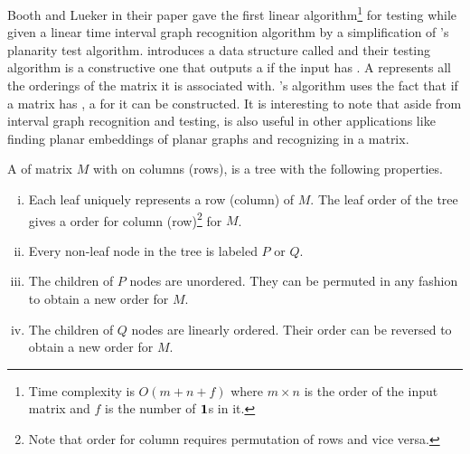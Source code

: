 Booth and Lueker in their paper \cite{bl76} gave the first linear
algorithm\footnote{Time complexity is $O\left(m+n+f\right)$ where $m
  \times n$ is the order of the input matrix and $f$ is the number of
  $\textbf{1}$s in it.} for \cop testing while given a linear time interval
graph recognition algorithm by a simplification of 's planarity test algorithm.
%
\cite{bl76} introduces a data structure called \PQtree and their \COP
testing algorithm is a constructive one that outputs a \PQtree if the
input has \COP. A \PQtree represents all the \COP orderings of the
matrix it is associated with. \cite{bl76}'s algorithm uses the fact
that if a matrix has \COP, a \PQtree for it can be constructed. It is
interesting to note that aside from interval graph recognition and
\COP testing, \PQtree is also useful in other applications like
finding planar embeddings of planar graphs \cite{lec67,mcc04} and
recognizing \CROP in a matrix.

\begin{definition}
  A \PQtree of matrix $M$ with \COP on columns (rows), is a tree with
  the following properties.
  \begin{enumerate}[i.]
    \singlespacing
  \item Each leaf uniquely represents a row (column) of $M$. The leaf
    order of the tree gives a \COP order for column (row)\footnote{Note
      that \COP order for column requires permutation of rows and vice
      versa.} for $M$.
  \item Every non-leaf node in the tree is labeled $P$ or $Q$.
  \item \label{def::nodep} The children of $P$ nodes are
    unordered. They can be permuted in any fashion to obtain a new
    \COP order for $M$.
  \item \label{def::nodeq} The children of $Q$ nodes are linearly
    ordered. Their order can be reversed to obtain a new \COP
    order for $M$.
  \end{enumerate}
  \label{def:pqtree}
\end{definition}

